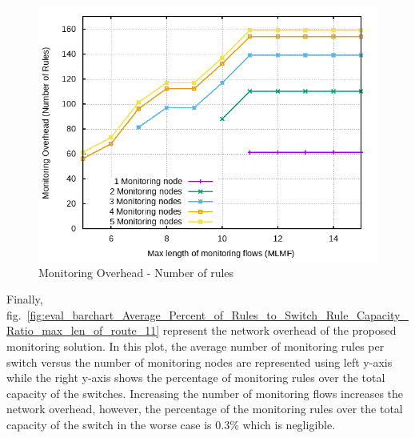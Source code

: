\documentclass[10pt, journal, letterpaper]{IEEEtran}
\begin{document}
\begin{figure}
    \centering
    \includegraphics[width=.9\columnwidth]{img/eval_Abilene_Max_Length_of_Routes_Number_of_Required_Rules.png}
    \caption{Monitoring Overhead - Number of rules}
    \label{fig:required_rules}
\end{figure}
Finally, fig.~\ref{fig:eval_barchart_Average_Percent_of_Rules_to_Switch_Rule_Capacity_Ratio_max_len_of_route_11} represent the network overhead of the proposed monitoring solution. In this plot, the average number of monitoring rules per switch versus the number of monitoring nodes are represented using left y-axis while the right y-axis shows the percentage of monitoring rules over the total capacity of the switches. Increasing the number of monitoring flows increases the network overhead, however, the percentage of the monitoring rules over the total capacity of the switch in the worse case is $0.3\%$ which is negligible.
\end{document}
